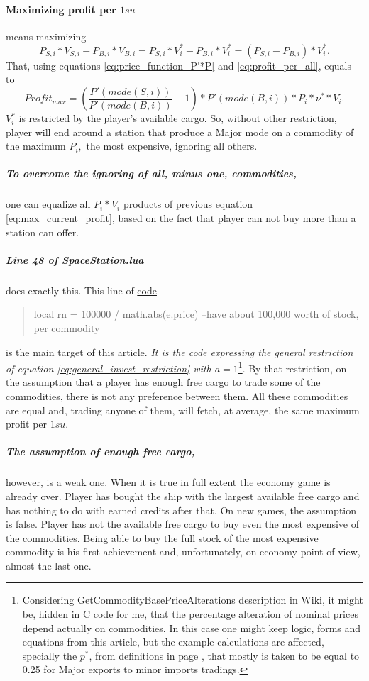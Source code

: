 \documentclass[]{article}
\begin{document}
 \paragraph{Maximizing profit per $1su$} means maximizing 
 \[P_{S,i}*V_{S,i}-P_{B,i}*V_{B,i}=P_{S,i}*V^{*}_{i}-P_{B,i}*V^{*}_{i}=(P_{S,i}-P_{B,i})*V^{*}_{i}.\]
 That, using equations \eqref{eq:price_function_P'*P} and \eqref{eq:profit_per_all}, equals to
 \begin{equation}\label{eq:max_current_profit}
 	Profit_{max}= (\dfrac{P'(mode(S,i))}{P'(mode(B,i))}-1)*P'(mode(B,i))*P_{i}*\nu^{*}*V_{i}.
 \end{equation}
$V^{*}_{i}$ is restricted by the player's available cargo. So, without other restriction, player will end around a station that produce a Major mode on a commodity of the maximum $P_{i},$ the most expensive, ignoring all others.
\subparagraph*{To overcome the ignoring of all, minus one, commodities,} one can equalize all $P_{i}*V_{i}$ products of previous equation \eqref{eq:max_current_profit}, based on the fact that player can not buy more than a station can offer.
\subparagraph{Line 48 of SpaceStation.lua} does exactly this. This line of \hyperref{https://github.com/pioneerspacesim/pioneer/blob/25bc005c67a43eb2c17fcb83fe20f5d07a6b394c/data/libs/SpaceStation.lua#L48}{}{}{code} 
\begin{quote}
				local rn = 100000 / math.abs(e.price) --have about 100,000 worth of stock, per commodity
\end{quote}
is the main target of this article. \emph{It is the code expressing the general restriction of equation \eqref{eq:general_invest_restriction} with $a=1$}\footnote{Considering GetCommodityBasePriceAlterations description in Wiki, it might be, hidden in C code for me, that the percentage alteration of nominal prices depend actually on commodities. In this case one might keep logic, forms and equations from this article, but the example calculations are affected, specially the $p^{*}$, from definitions in page \pageref{sec:generalRestriction}, that mostly is taken to be equal to 0.25 for Major exports to minor imports tradings.}. By that restriction, on the assumption that a player has enough free cargo to trade some of the commodities, there is not any preference between them. All these  commodities are equal and, trading anyone of them, will fetch, at average, the same maximum profit per $1su.$ 
\subparagraph*{The assumption of enough free cargo,} however, is a weak one. When it is true in full extent the economy game is already over. Player has bought the ship with the largest available free cargo and has nothing to do with earned credits after that. On new games, the assumption is false. Player has not the available free cargo to buy even the most expensive of the commodities. Being able to buy the full stock of the most expensive commodity is his first achievement and, unfortunately, on economy point of view, almost the last one. 
\end{document}
